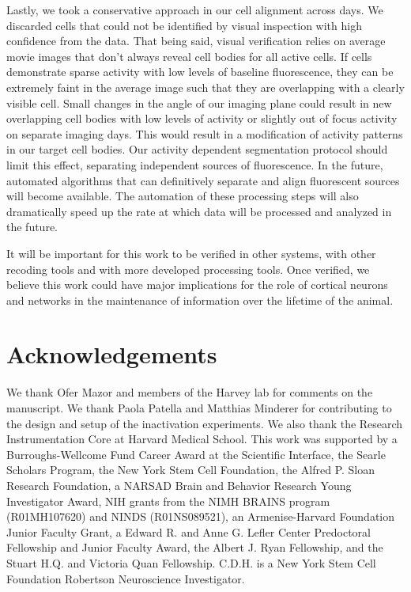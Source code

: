 Lastly, we took a conservative approach in our cell alignment across days. We discarded cells that could not be identified by visual inspection with high confidence from the data. That being said, visual verification relies on average movie images that don't always reveal cell bodies for all active cells. If cells demonstrate sparse activity with low levels of baseline fluorescence, they can be extremely faint in the average image such that they are overlapping with a clearly visible cell. Small changes in the angle of our imaging plane could result in new overlapping cell bodies with low levels of activity or slightly out of focus activity on separate imaging days. This would result in a modification of activity patterns in our target cell bodies. Our activity dependent segmentation protocol should limit this effect, separating independent sources of fluorescence. In the future, automated algorithms that can definitively separate and align fluorescent sources will become available. The automation of these processing steps will also dramatically speed up the rate at which data will be processed and analyzed in the future. 

It will be important for this work to be verified in other systems, with other recoding tools and with more developed processing tools. Once verified, we believe this work could have major implications for the role of cortical neurons and networks in the maintenance of information over the lifetime of the animal.


\section{Acknowledgements}
We thank Ofer Mazor and members of the Harvey lab for comments on the manuscript. We thank Paola Patella and Matthias Minderer for contributing to the design and setup of the inactivation experiments. We also thank the Research Instrumentation Core at Harvard Medical School. This work was supported by a Burroughs-Wellcome Fund Career Award at the Scientific Interface, the Searle Scholars Program, the New York Stem Cell Foundation, the Alfred P. Sloan Research Foundation, a NARSAD Brain and Behavior Research Young Investigator Award, NIH grants from the NIMH BRAINS program (R01MH107620) and NINDS (R01NS089521), an Armenise-Harvard Foundation Junior Faculty Grant, a Edward R. and Anne G. Lefler Center Predoctoral Fellowship and Junior Faculty Award, the Albert J. Ryan Fellowship, and the Stuart H.Q. and Victoria Quan Fellowship. C.D.H. is a New York Stem Cell Foundation Robertson Neuroscience Investigator. 

